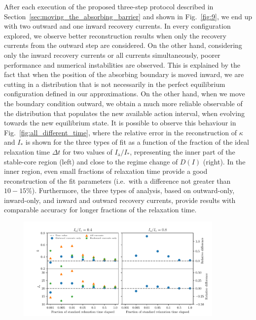 {After each execution of the proposed three-step protocol described in Section~\ref{sec:moving_the_absorbing_barrier} and shown in Fig.~\ref{fig:9}, we end up with two outward and one inward recovery currents. In every configuration explored, we observe better reconstruction results when only the recovery currents from the outward step are considered. On the other hand, considering only the inward recovery currents or all currents simultaneously, poorer performance and numerical instabilities are observed. This is explained by the fact that when the position of the absorbing boundary is moved inward, we are cutting in a distribution that is not necessarily in the perfect equilibrium configuration defined in our approximations. On the other hand, when we move the boundary condition outward, we obtain a much more reliable observable of the distribution that populates the new available action interval, when evolving towards the new equilibrium state. It is possible to observe this behaviour in Fig.~\ref{fig:all_different_time}, where the relative error in the reconstruction of $\kappa$ and $I_\ast$ is shown for the three types of fit as a function of the fraction of the ideal relaxation time $\Delta t$ for two values of $I_\mathrm{a}/I_\ast$, representing the inner part of the stable-core region (left) and close to the regime change of $D(I)$ (right). In the inner region, even small fractions of relaxation time provide a good reconstruction of the fit parameters {(i.e.\ with a difference not greater than $10-15\%$)}. Furthermore, the three types of analysis, based on outward-only, inward-only, and inward and outward recovery currents, provide results with comparable accuracy for longer fractions of the relaxation time.  
%
\begin{figure}[t]
    \centering
    \includegraphics[width=0.9\textwidth]{4_probing_the_diffusive_behavior/figs/final/better_plot.pdf}

\end{figure}}
